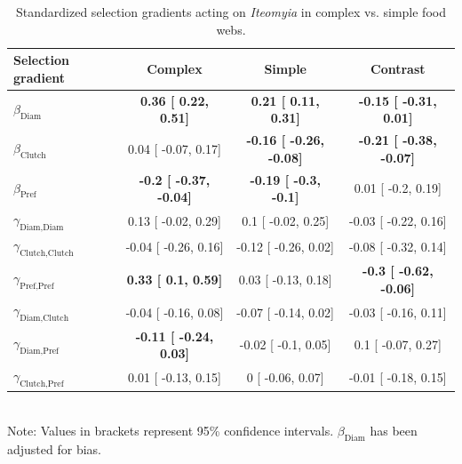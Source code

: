 \newpage

\begin{table}[h]
\caption{Standardized selection gradients acting on \textit{Iteomyia} in complex vs. simple food webs.}
\label{Table:Gradients}
\centering
\begin{tabular}{lccc}
\\ 
\hline
\textbf{Selection gradient} & \textbf{Complex} & \textbf{Simple} & \textbf{Contrast}  \\ 
\hline
$\beta_{\text{Diam}}$ & 
\textbf{
0.36 [
0.22,
0.51] }& 
\textbf{
0.21 [
0.11,
0.31] }& 
\textbf{
-0.15 [
-0.31,
0.01] }\\

$\beta_{\text{Clutch}}$ & 
0.04 [
-0.07,
0.17] & 
\textbf{
-0.16 [
-0.26,
-0.08] }& 
\textbf{
-0.21 [
-0.38,
-0.07] }\\

$\beta_{\text{Pref}}$ &
\textbf{
-0.2 [
-0.37,
-0.04] }& 
\textbf{
-0.19 [
-0.3,
-0.1] }& 

0.01 [
-0.2,
0.19] \\

$\gamma_{\text{Diam,Diam}}$ &
0.13 [
-0.02,
0.29] & 

0.1 [
-0.02,
0.25] & 

-0.03 [
-0.22,
0.16] \\

$\gamma_{\text{Clutch,Clutch}}$ & 
-0.04 [
-0.26,
0.16] & 

-0.12 [
-0.26,
0.02] & 

-0.08 [
-0.32,
0.14] \\

$\gamma_{\text{Pref,Pref}}$ & 
\textbf{
0.33 [
0.1,
0.59] }& 

0.03 [
-0.13,
0.18] & 
\textbf{
-0.3 [
-0.62,
-0.06] }\\

$\gamma_{\text{Diam,Clutch}}$ & 
-0.04 [
-0.16,
0.08] & 

-0.07 [
-0.14,
0.02] & 

-0.03 [
-0.16,
0.11] \\

$\gamma_{\text{Diam,Pref}}$ & 
\textbf{
-0.11 [
-0.24,
0.03] }& 

-0.02 [
-0.1,
0.05] & 

0.1 [
-0.07,
0.27] \\

$\gamma_{\text{Clutch,Pref}}$ & 
0.01 [
-0.13,
0.15] & 

0 [
-0.06,
0.07] & 

-0.01 [
-0.18,
0.15] \\ 
\hline
\end{tabular}
\bigskip{}
\\
{\footnotesize Note: Values in brackets represent 95\% confidence intervals. $\beta_{\text{Diam}}$ has been adjusted for bias.}
\end{table}


